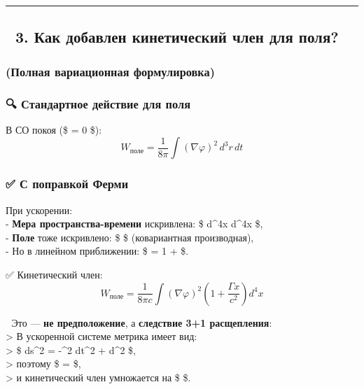 \documentclass[11pt]{article}
\begin{document}
\begin{center}\rule{0.5\linewidth}{\linethickness}\end{center}

\subsection{🔹 3. Как добавлен кинетический член для
поля?}\label{ux43aux430ux43a-ux434ux43eux431ux430ux432ux43bux435ux43d-ux43aux438ux43dux435ux442ux438ux447ux435ux441ux43aux438ux439-ux447ux43bux435ux43d-ux434ux43bux44f-ux43fux43eux43bux44f}

\subsubsection{(Полная вариационная
формулировка)}\label{ux43fux43eux43bux43dux430ux44f-ux432ux430ux440ux438ux430ux446ux438ux43eux43dux43dux430ux44f-ux444ux43eux440ux43cux443ux43bux438ux440ux43eux432ux43aux430}

\subsubsection{🔍 Стандартное действие для
поля}\label{ux441ux442ux430ux43dux434ux430ux440ux442ux43dux43eux435-ux434ux435ux439ux441ux442ux432ux438ux435-ux434ux43bux44f-ux43fux43eux43bux44f}

В СО покоя (\$  = 0 \$): \[
W_{\text{поле}} = \frac{1}{8\pi} \int (\nabla \varphi)^2 \, d^3r \, dt
\]

\subsubsection{✅ С поправкой
Ферми}\label{ux441-ux43fux43eux43fux440ux430ux432ux43aux43eux439-ux444ux435ux440ux43cux438-1}

При ускорении:\\
- \textbf{Мера пространства-времени} искривлена: \$ d\^{}4x \to d\^{}4x
\cdot {} \$,\\
- \textbf{Поле} тоже искривлено: \$ \nabla \varphi \to \nabla \varphi \$
(ковариантная производная),\\
- Но в линейном приближении: \$  = 1 + 
\$.

✅ Кинетический член: \[
\boxed{
W_{\text{поле}} = \frac{1}{8\pi c} \int (\nabla \varphi)^2 \left( 1 + \frac{\Gamma x}{c^2} \right) d^4x
}
\]

📌 Это --- \textbf{не предположение}, а \textbf{следствие 3+1
расщепления}:\\
\textgreater{} В ускоренной системе метрика имеет вид:\\
\textgreater{} \$ ds\^{}2 = -\^{}2 dt\^{}2 + d\^{}2
\$,\\
\textgreater{} поэтому \$  =  \$,\\
\textgreater{} и кинетический член умножается на \$  \$.
\end{document}
